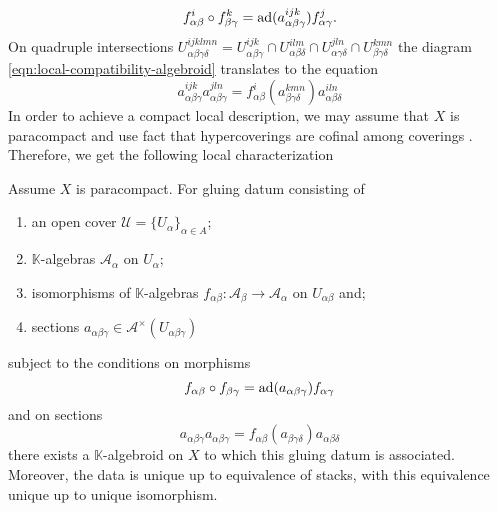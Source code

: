 \[
	f_{\alpha\beta}^{i} \circ f_{\beta\gamma}^{k} = \operatorname{ad}(a^{ijk}_{\alpha \beta \gamma})f_{\alpha\gamma}^{j}.
\]
On quadruple intersections $U_{\alpha\beta\gamma \delta}^{ijklmn} = U_{\alpha \beta \gamma}^{ijk} \cap U_{\alpha \beta \delta}^{ilm} \cap U_{\alpha \gamma \delta}^{jln}\cap U_{\beta \gamma \delta}^{kmn}$ the diagram \eqref{eqn:local-compatibility-algebroid} translates to the equation
\[
	a_{\alpha \beta \gamma}^{ijk}a_{\alpha \beta \gamma}^{jln} = f_{\alpha \beta}^{i}(a_{\beta \gamma \delta}^{kmn})a_{\alpha \beta \delta}^{iln}
\]
In order to achieve a compact local description, we may assume that $X$ is paracompact and use fact that hypercoverings are cofinal among coverings \cite[Chapitre II, Lemme 3.8.1.]{Godement}. Therefore, we get the following local characterization
\begin{proposition}\label{prop:local-data-algebroid}
	Assume $X$ is paracompact. For gluing datum consisting of
	\begin{enumerate}[noitemsep, label = (\roman*)]
		\item an open cover $\mathscr{U} = \{U_{\alpha}\}_{\alpha\in A}$;
		\item $\mathbb{K}$-algebras $\mathscr{A}_{\alpha}$ on $U_{\alpha}$;
		\item isomorphisms of $\mathbb{K}$-algebras $f_{\alpha\beta}\colon \mathscr{A}_{\beta} \to \mathscr{A}_{\alpha}$ on $U_{\alpha\beta}$ and;
		\item sections $a_{\alpha \beta \gamma}\in \mathscr{A}^{\times}(U_{\alpha \beta \gamma})$
	\end{enumerate}
	subject to the conditions on morphisms
	\begin{equation}\label{eqn:gluing-datum-algebroid-morphisms}
		f_{\alpha\beta} \circ f_{\beta\gamma} = \operatorname{ad}(a_{\alpha \beta \gamma})f_{\alpha\gamma}
	\end{equation}
	and on sections
	\begin{equation}\label{eqn:gluing-datum-algebroid-sections}
		a_{\alpha \beta \gamma}a_{\alpha \beta \gamma} = f_{\alpha \beta}(a_{\beta \gamma \delta})a_{\alpha \beta \delta}
	\end{equation}
	there exists a $\mathbb{K}$-algebroid on $X$ to which this gluing datum is associated. Moreover, the data is unique up to equivalence of stacks, with this equivalence unique up to unique isomorphism.
	
\end{proposition}

